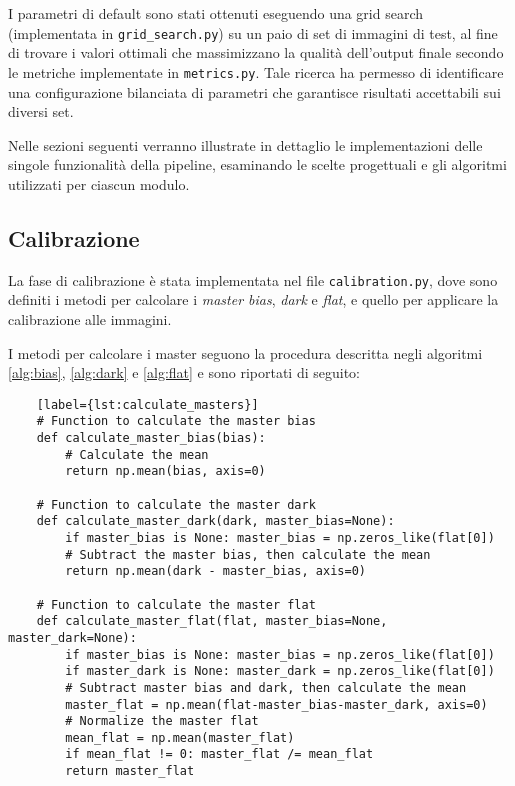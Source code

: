 I parametri di default sono stati ottenuti eseguendo una grid search (implementata in \texttt{grid\_search.py}) su un paio di set di immagini di test, al fine di trovare i valori ottimali che massimizzano la qualità dell'output finale secondo le metriche implementate in \texttt{metrics.py}. Tale ricerca ha permesso di identificare una configurazione bilanciata di parametri che garantisce risultati accettabili sui diversi set.

Nelle sezioni seguenti verranno illustrate in dettaglio le implementazioni delle singole funzionalità della pipeline, esaminando le scelte progettuali e gli algoritmi utilizzati per ciascun modulo.

\subsection{Calibrazione} \label{subsec:calibration_impl}

La fase di calibrazione è stata implementata nel file \texttt{calibration.py}, dove sono definiti i metodi per calcolare i \textit{master bias}, \textit{dark} e \textit{flat}, e quello per applicare la calibrazione alle immagini.

I metodi per calcolare i master seguono la procedura descritta negli algoritmi \ref{alg:bias}, \ref{alg:dark} e \ref{alg:flat} e sono riportati di seguito:

\begin{lstlisting}
    [label={lst:calculate_masters}]
    # Function to calculate the master bias
    def calculate_master_bias(bias):
        # Calculate the mean
        return np.mean(bias, axis=0)

    # Function to calculate the master dark
    def calculate_master_dark(dark, master_bias=None):
        if master_bias is None: master_bias = np.zeros_like(flat[0])
        # Subtract the master bias, then calculate the mean
        return np.mean(dark - master_bias, axis=0)

    # Function to calculate the master flat
    def calculate_master_flat(flat, master_bias=None, master_dark=None):
        if master_bias is None: master_bias = np.zeros_like(flat[0])
        if master_dark is None: master_dark = np.zeros_like(flat[0])
        # Subtract master bias and dark, then calculate the mean
        master_flat = np.mean(flat-master_bias-master_dark, axis=0)   
        # Normalize the master flat
        mean_flat = np.mean(master_flat)
        if mean_flat != 0: master_flat /= mean_flat
        return master_flat
\end{lstlisting}

